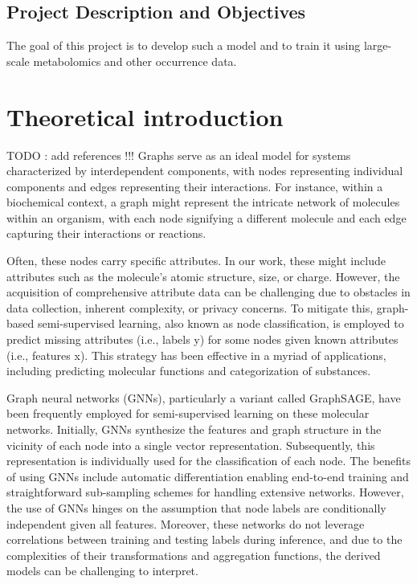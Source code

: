 \documentclass[
11pt, %
english, %
singlespacing, %
headsepline, %
chapterinoneline, %
]{MastersDoctoralThesis} %
\begin{document}
\section{Project Description and Objectives}
The goal of this project is to develop such a model and to train it using large-scale metabolomics and other occurrence data.



\chapter{Theoretical introduction}\label{chap:Theoretical introduction}
TODO : add references !!!
Graphs serve as an ideal model for systems characterized by interdependent components, with nodes representing individual components and edges representing their interactions. For instance, within a biochemical context, a graph might represent the intricate network of molecules within an organism, with each node signifying a different molecule and each edge capturing their interactions or reactions.

Often, these nodes carry specific attributes. In our work, these might include attributes such as the molecule's atomic structure, size, or charge. However, the acquisition of comprehensive attribute data can be challenging due to obstacles in data collection, inherent complexity, or privacy concerns. To mitigate this, graph-based semi-supervised learning, also known as node classification, is employed to predict missing attributes (i.e., labels y) for some nodes given known attributes (i.e., features x). This strategy has been effective in a myriad of applications, including predicting molecular functions and categorization of substances.

Graph neural networks (GNNs), particularly a variant called GraphSAGE, have been frequently employed for semi-supervised learning on these molecular networks. Initially, GNNs synthesize the features and graph structure in the vicinity of each node into a single vector representation. Subsequently, this representation is individually used for the classification of each node. The benefits of using GNNs include automatic differentiation enabling end-to-end training and straightforward sub-sampling schemes for handling extensive networks. However, the use of GNNs hinges on the assumption that node labels are conditionally independent given all features. Moreover, these networks do not leverage correlations between training and testing labels during inference, and due to the complexities of their transformations and aggregation functions, the derived models can be challenging to interpret.
\end{document}
